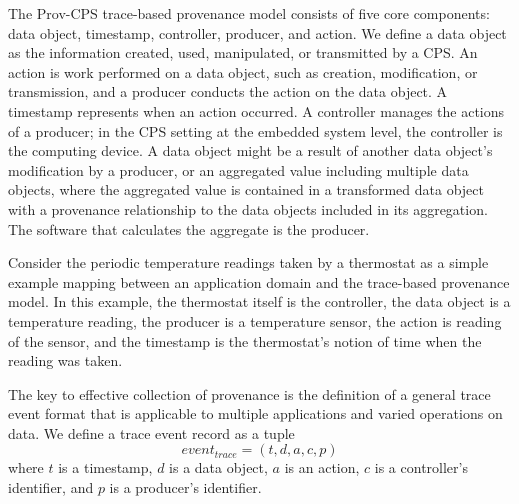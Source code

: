 


The Prov-CPS trace-based provenance model consists of five core components: data object, timestamp, controller, producer, and action. We define a data object as the information created, used, manipulated, or transmitted by a CPS. An action is work performed on a data object, such as creation, modification, or transmission, and a producer conducts the action on the data object.  A timestamp represents when an action occurred. A controller manages the actions of a producer; in the CPS setting at the embedded system level, the controller is the computing device.  A data object might be a result of another data object's modification by a producer, or an aggregated value including multiple data objects, where the aggregated value is contained in a transformed data object with a provenance relationship to the data objects included in its aggregation. The software that calculates the aggregate is the producer. 

Consider the periodic temperature readings taken by a thermostat as a simple example mapping between an application domain and the trace-based provenance model. In this example, the thermostat itself is the controller, the data object is a temperature reading, the producer is a temperature sensor, the action is reading of the sensor, and the timestamp is the thermostat's notion of time when the reading was taken.

The key to effective collection of provenance is the definition of a general trace event format that is applicable to multiple applications and varied operations on data. We define a trace event record as a tuple 
 \[ event_{trace} = (t, d, a, c, p ) \] 
 where $t$ is a timestamp, $d$ is a data object, $a$ is an action, $c$ is a controller's identifier, and $p$ is a producer's identifier.

